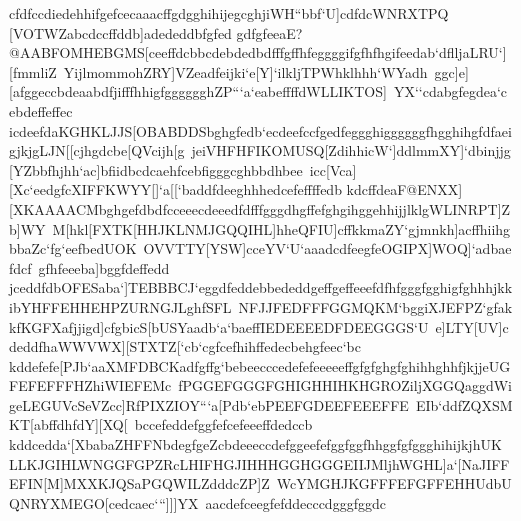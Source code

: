 {{{ cfdfccdiedehhifgefcecaaacffgdgghihijegcghjiWH``bbf`U]cdfdcWNRXTPQ%
 [VOTWZabcdccffddb]adededdbfgfed}
 \hbox{gdfgfeeaE?@AABFOMHEBGMS[ceeffdcbbcdebdedbdfffgffhfeggggifgfhfhgifeedab`dflljaLRU`][fmmliZ%
 YijlmommohZRY]VZeadfeijki`e[Y]`ilkljTPWhklhhh`WYadh%
 ggc]e][afggeccbdeaabdfjifffhhigfgggggghZP```a`eabeffffdWLLIKTOS]%
 YX``cdabgfegdea`cebdeffeffec}
 \hbox{icdeefdaKGHKLJJS[OBABDDSbghgfedb`ecdeefccfgedfeggghiggggggfhgghihgfdfaeigjkjgLJN[[cjhgdcbe[QVcijh[g%
 jeiVHFHFIKOMUSQ[ZdihhicW`]ddlmmXY]`dbinjjg[YZbbfhjhh`ac]bfiidbcdcaehfcebfigggcghbbdhbee%
 icc[Vca][Xc`eedgfcXIFFKWYY[]`a[[`baddfdeeghhhedcefeffffedb}
 \hbox{kdcffdeaF@ENXX][XKAAAACMbghgefdbdfcceeecdeeedfdfffgggdhgffefghgihggehhijjlklgWLINRPT]Zb]WY%
 M[hkl[FXTK[HHJKLNMJGQQIHL]hheQFIU]cffkkmaZY`gjmnkh]acffhiihgbbaZc`fg`eefbedUOK%
 OVVTTY[YSW]cceYV`U`aaadcdfeegfeOGIPX]WOQ]`adbaefdcf%
 gfhfeeeba]bggfdeffedd}
 \hbox{jceddfdbOFESaba`]TEBBBCJ`eggdfeddebbededdgeffgeffeeefdfhfgggfgghigfghhhjkkibYHFFEHHEHPZURNGJLghfSFL%
 NFJJFEDFFFGGMQKM`bggiXJEFPZ`gfakkfKGFXafjjigd]cfgbicS[bUSYaadb`a`baeffIEDEEEEDFDEEGGGS`U%
 e]LTY[UV]cdeddfhaWWVWX][STXTZ[`cb`cgfcefhihffedecbehgfeec`bc}
 \hbox{kddefefe[PJb`aaXMFDBCKadfgffg`bebeecccedefefeeeeeffgfgfghgfghihhghhfjkjjeUGFEFEFFFHZhiWIEFEMc%
 fPGGEFGGGFGHIGHHIHKHGROZiljXGGQaggdWigeLEGUVcSeVZcc]RfPIXZIOY```a[Pdb`ebPEEFGDEEFEEEFFE%
 EIb`ddfZQXSMKT[abffdhfdY][XQ[%
 bccefeddefggfefcefeeeffdedccb}
 \hbox{kddcedda`[XbabaZHFFNbdegfgeZcbdeeeccdefggeefefggfggfhhggfgfggghihijkjhUK%
 LLKJGIHLWNGGFGPZRcLHIFHGJIHHHGGHGGGEIIJMljhWGHL]a`[NaJIFFEFIN[M]MXXKJQSaPGQWILZdddcZP]Z%
 WcYMGHJKGFFFEFGFFEHHUdbUQNRYXMEGO[cedcaec```]]]YX%
 aacdefceegfefddecccdgggfggdc}
}}

